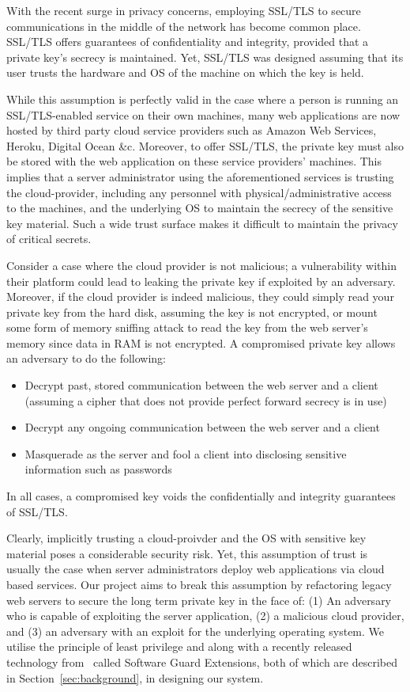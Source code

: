 \documentclass[../main.tex]{subfiles}
\begin{document}
With the recent surge in privacy concerns, employing SSL/TLS to secure
communications in the middle of the network has become common
place. SSL/TLS offers guarantees of confidentiality and integrity,
provided that a private key's secrecy is maintained. Yet, SSL/TLS was
designed assuming that its user trusts the hardware and OS of the
machine on which the key is held.
 
While this assumption is perfectly valid in the case where a person is
running an SSL/TLS-enabled service on their own machines, many web
applications are now hosted by third party cloud service providers
such as Amazon Web Services, Heroku, Digital Ocean \&c. Moreover, to
offer SSL/TLS, the private key must also be stored with the web
application on these service providers' machines. This implies that a
server administrator using the aforementioned services is trusting the
cloud-provider, including any personnel with physical/administrative
access to the machines, and the underlying OS to maintain the secrecy
of the sensitive key material. Such a wide trust surface makes it
difficult to maintain the privacy of critical secrets.


Consider a case where the cloud provider is not malicious; a
vulnerability within their platform could lead to leaking the private
key if exploited by an adversary. Moreover, if the cloud provider is
indeed malicious, they could simply read your private key from the hard
disk, assuming the key is not encrypted, or mount some form of memory
sniffing attack to read the key from the web server's memory since
data in RAM is not encrypted. A compromised private key allows an
adversary to do the following:
\begin{itemize}
  \item Decrypt past, stored communication between the web server and a
    client (assuming a cipher that does not provide perfect forward
    secrecy is in use)
  \item Decrypt any ongoing communication between the web server and a
    client
  \item Masquerade as the server and fool a client into disclosing
    sensitive information such as passwords
\end{itemize}
In all cases, a compromised key voids the confidentially and integrity
guarantees of SSL/TLS.

Clearly, implicitly trusting a cloud-proivder and the OS with
sensitive key material poses a considerable security risk. Yet, this
assumption of trust is usually the case when server administrators
deploy web applications via cloud based services. Our project aims to
break this assumption by refactoring legacy web servers to secure the
long term private key in the face of: (1) An adversary who is capable
of exploiting the server application, (2) a malicious cloud provider,
and (3) an adversary with an exploit for the underlying operating
system. We utilise the principle of least privilege and along with a
recently released technology from \Intel~called Software Guard
Extensions, both of which are described in
Section~\ref{sec:background}, in designing our system.
\end{document}
